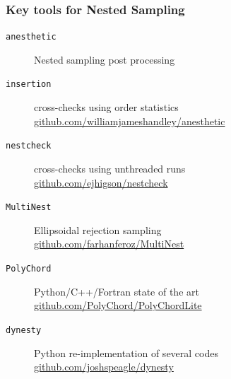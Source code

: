 \documentclass[aspectratio=169]{beamer}
\begin{document}
\begin{frame}
    \frametitle{Key tools for Nested Sampling}
    \begin{description}
        \item[\texttt{anesthetic}] Nested sampling post processing \\
        \item[\texttt{insertion}] cross-checks using order statistics 
            \hspace{5pt}\url{github.com/williamjameshandley/anesthetic}
        \item[\texttt{nestcheck}] cross-checks using unthreaded runs \\
            \hspace{5pt}\url{github.com/ejhigson/nestcheck}
        \item[\texttt{MultiNest}] Ellipsoidal rejection sampling \\
            \hspace{5pt}\url{github.com/farhanferoz/MultiNest}
        \item[\texttt{PolyChord}] Python/C++/Fortran state of the art \\
            \hspace{5pt}\url{github.com/PolyChord/PolyChordLite} 
        \item[\texttt{dynesty}] Python re-implementation of several codes \\
            \hspace{5pt}\url{github.com/joshspeagle/dynesty}
    \end{description}
\end{frame}
\end{document}
